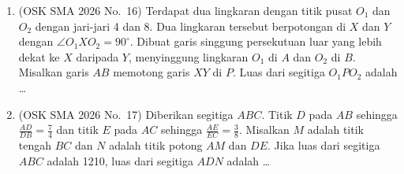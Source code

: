 \documentclass[12pt,a4paper]{article}
\begin{document}
\begin{enumerate}
\item (OSK SMA 2026 No.\ 16) Terdapat dua lingkaran dengan titik pusat $O_{1}$ dan $O_{2}$ dengan jari-jari 4 dan 8. Dua lingkaran tersebut berpotongan di $X$ dan $Y$ dengan $\angle O_{1}XO_{2}=90^{\circ}$. Dibuat garis singgung persekutuan luar yang lebih dekat ke $X$ daripada $Y$, menyinggung lingkaran $O_{1}$ di $A$ dan $O_{2}$ di $B$. Misalkan garis $AB$ memotong garis $XY$ di $P$. Luas dari segitiga $O_{1}PO_{2}$ adalah \dots

\item (OSK SMA 2026 No.\ 17) Diberikan segitiga $ABC$. Titik $D$ pada $AB$ sehingga $\frac{AD}{DB}=\frac{7}{4}$ dan titik $E$ pada $AC$ sehingga $\frac{AE}{EC}=\frac{3}{8}$. Misalkan $M$ adalah titik tengah $BC$ dan $N$ adalah titik potong $AM$ dan $DE$. Jika luas dari segitiga $ABC$ adalah 1210, luas dari segitiga $ADN$ adalah \dots

\end{enumerate}
\end{document}
